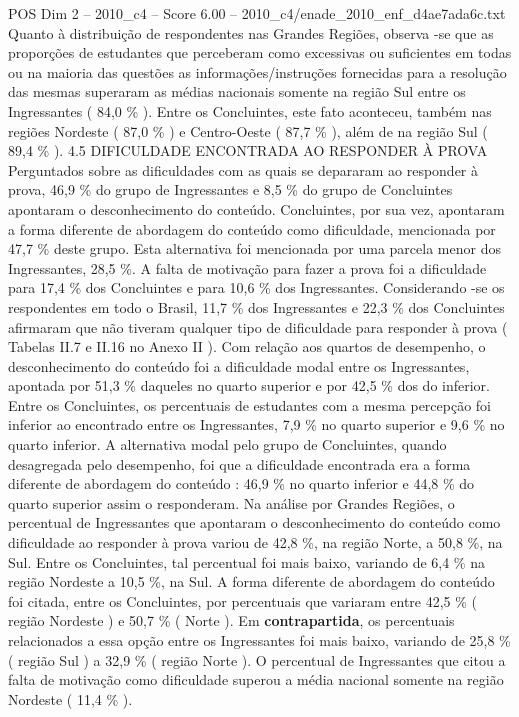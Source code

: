\begin{textsample}{POS Dim 2 – 2010\_c4 – Score 6.00 – 2010\_c4/enade\_2010\_enf\_d4ae7ada6c.txt}
Quanto à distribuição de respondentes nas Grandes Regiões, observa -se que as proporções de estudantes que perceberam como excessivas ou suficientes em todas ou na maioria das questões as informações/instruções fornecidas para a resolução das mesmas superaram as médias nacionais somente na região Sul entre os Ingressantes ( 84,0 \% ).
Entre os Concluintes, este fato aconteceu, também nas regiões Nordeste ( 87,0 \% ) e Centro-Oeste ( 87,7 \% ), além de na região Sul ( 89,4 \% ). 4.5 DIFICULDADE ENCONTRADA AO RESPONDER À PROVA Perguntados sobre as dificuldades com as quais se depararam ao responder à prova, 46,9 \% do grupo de Ingressantes e 8,5 \% do grupo de Concluintes apontaram o desconhecimento do conteúdo.
Concluintes, por sua vez, apontaram a forma diferente de abordagem do conteúdo como dificuldade, mencionada por 47,7 \% deste grupo.
Esta alternativa foi mencionada por uma parcela menor dos Ingressantes, 28,5 \%.
A falta de motivação para fazer a prova foi a dificuldade para 17,4 \% dos Concluintes e para 10,6 \% dos Ingressantes.
Considerando -se os respondentes em todo o Brasil, 11,7 \% dos Ingressantes e 22,3 \% dos Concluintes afirmaram que não tiveram qualquer tipo de dificuldade para responder à prova ( Tabelas II.7 e II.16 no Anexo II ).
Com relação aos quartos de desempenho, o desconhecimento do conteúdo foi a dificuldade modal entre os Ingressantes, apontada por 51,3 \% daqueles no quarto superior e por 42,5 \% dos do inferior.
Entre os Concluintes, os percentuais de estudantes com a mesma percepção foi inferior ao encontrado entre os Ingressantes, 7,9 \% no quarto superior e 9,6 \% no quarto inferior.
A alternativa modal pelo grupo de Concluintes, quando desagregada pelo desempenho, foi que a dificuldade encontrada era a forma diferente de abordagem do conteúdo : 46,9 \% no quarto inferior e 44,8 \% do quarto superior assim o responderam.
Na análise por Grandes Regiões, o percentual de Ingressantes que apontaram o desconhecimento do conteúdo como dificuldade ao responder à prova variou de 42,8 \%, na região Norte, a 50,8 \%, na Sul.
Entre os Concluintes, tal percentual foi mais baixo, variando de 6,4 \% na região Nordeste a 10,5 \%, na Sul.
A forma diferente de abordagem do conteúdo foi citada, entre os Concluintes, por percentuais que variaram entre 42,5 \% ( região Nordeste ) e 50,7 \% ( Norte ).
Em \textbf{contrapartida}, os percentuais relacionados a essa opção entre os Ingressantes foi mais baixo, variando de 25,8 \% ( região Sul ) a 32,9 \% ( região Norte ).
O percentual de Ingressantes que citou a falta de motivação como dificuldade superou a média nacional somente na região Nordeste ( 11,4 \% ).

\end{textsample}
